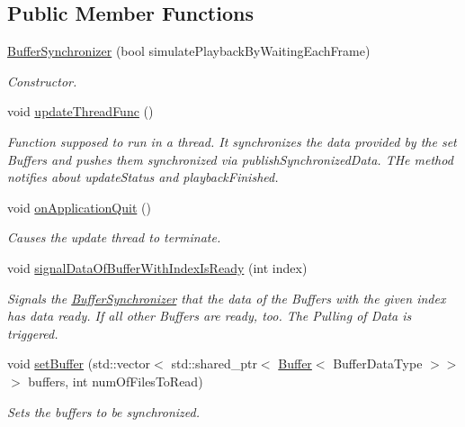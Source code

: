 \subsection*{Public Member Functions}
\begin{DoxyCompactItemize}
\item 
\hyperlink{class_buffer_synchronizer_a2f5891cdfcabf932a3d3306c20263b35}{Buffer\+Synchronizer} (bool simulate\+Playback\+By\+Waiting\+Each\+Frame)
\begin{DoxyCompactList}\small\item\em Constructor. \end{DoxyCompactList}\item 
\hypertarget{class_buffer_synchronizer_ad4c5d37a239212655ccc7589b442faa5}{}void \hyperlink{class_buffer_synchronizer_ad4c5d37a239212655ccc7589b442faa5}{update\+Thread\+Func} ()\label{class_buffer_synchronizer_ad4c5d37a239212655ccc7589b442faa5}

\begin{DoxyCompactList}\small\item\em Function supposed to run in a thread. It synchronizes the data provided by the set Buffers and pushes them synchronized via publish\+Synchronized\+Data. T\+He method notifies about update\+Status and playback\+Finished. \end{DoxyCompactList}\item 
\hypertarget{class_buffer_synchronizer_a65548865ccdf9703fcfc6887f1a48e29}{}void \hyperlink{class_buffer_synchronizer_a65548865ccdf9703fcfc6887f1a48e29}{on\+Application\+Quit} ()\label{class_buffer_synchronizer_a65548865ccdf9703fcfc6887f1a48e29}

\begin{DoxyCompactList}\small\item\em Causes the update thread to terminate. \end{DoxyCompactList}\item 
void \hyperlink{class_buffer_synchronizer_a398056f233d82a985b72fed992dcf86a}{signal\+Data\+Of\+Buffer\+With\+Index\+Is\+Ready} (int index)
\begin{DoxyCompactList}\small\item\em Signals the \hyperlink{class_buffer_synchronizer}{Buffer\+Synchronizer} that the data of the Buffers with the given index has data ready. If all other Buffers are ready, too. The Pulling of Data is triggered. \end{DoxyCompactList}\item 
void \hyperlink{class_buffer_synchronizer_aa91d6f92f9202f75ff1d20a7357dcba5}{set\+Buffer} (std\+::vector$<$ std\+::shared\+\_\+ptr$<$ \hyperlink{class_buffer}{Buffer}$<$ Buffer\+Data\+Type $>$$>$$>$ buffers, int num\+Of\+Files\+To\+Read)
\begin{DoxyCompactList}\small\item\em Sets the buffers to be synchronized. \end{DoxyCompactList}\end{DoxyCompactItemize}

